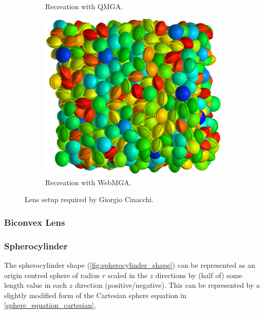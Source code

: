\begin{figure}
\begin{center}
\begin{subfigure}{0.3\textwidth}
      \caption{Recreation with QMGA.}
      \label{fig:cinacchi_lens_qmga}
    \end{subfigure}
    \begin{subfigure}{0.3\textwidth}
      \includegraphics[width=\textwidth]{assets/images/webmga}
      \caption{Recreation with WebMGA.}
      \label{fig:cinacchi_lens_webmga}
    \end{subfigure}
  \end{center}
  \caption{Lens setup required by Giorgio Cinacchi.}
  \label{fig:cinacchi_lens}
\end{figure}

\subsubsection{Biconvex Lens}
\label{biconvex_section}

\subsubsection{Spherocylinder}
\label{spherocylinder_section}
The spherocylinder shape (\cref{fig:spherocylinder_shape}) can be represented as an origin centred sphere of radius $r$ scaled in the $z$ directions by (half of) some length value in each $z$ direction (positive/negative). This can be represented by a slightly modified form of the Cartesian sphere equation in \cref{sphere_equation_cartesian},

